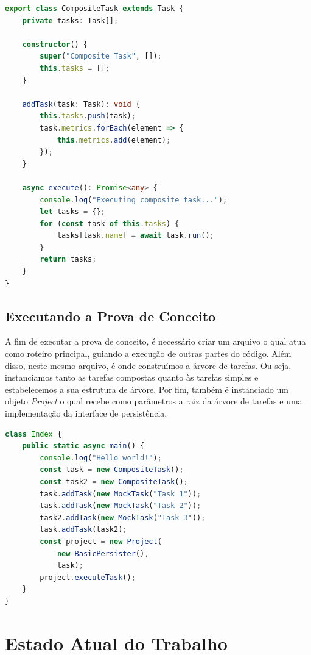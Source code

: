 \documentclass[12pt]{tcc}
\begin{document}
\begin{lstlisting}[label={lst:composite_task}, caption={Tarefa composta, define o comportamento de todos os nós não folha da árvore de tarefas.}, language=TypeScript]
export class CompositeTask extends Task {
    private tasks: Task[];

    constructor() {
        super("Composite Task", []);
        this.tasks = [];
    }

    addTask(task: Task): void {
        this.tasks.push(task);
        task.metrics.forEach(element => {
            this.metrics.add(element);
        });
    }

    async execute(): Promise<any> {
        console.log("Executing composite task...");
        let tasks = {};
        for (const task of this.tasks) {
            tasks[task.name] = await task.run();
        }
        return tasks;
    }
}
\end{lstlisting}


\section{Executando a Prova de Conceito}
\label{sec:exe_poc}
A fim de executar a prova de conceito, é necessário criar um arquivo o qual atua como roteiro principal, guiando a execução de outras partes do código.
Além disso, neste mesmo arquivo, é onde construímos a árvore de tarefas.
Ou seja, instanciamos tanto as tarefas compostas quanto às tarefas simples e estabelecemos a sua estrutura de árvore.
Por fim, também é instanciado um objeto \emph{Project} o qual recebe como parâmetros a raiz da árvore de tarefas e uma implementação da interface de persistência.

\begin{lstlisting}[label={lst:index_ts}, caption={Exemplo de roteiro principal para executar a prova de conceito.}, language=TypeScript]
class Index {
	public static async main() {
		console.log("Hello world!");
		const task = new CompositeTask();
		const task2 = new CompositeTask();
		task.addTask(new MockTask("Task 1"));
		task.addTask(new MockTask("Task 2"));
		task2.addTask(new MockTask("Task 3"));
		task.addTask(task2);
		const project = new Project(
			new BasicPersister(),
			task);
		project.executeTask();
	}
}
\end{lstlisting}

\chapter{Estado Atual do Trabalho}
\label{cap:estado_atual}
\end{document}
